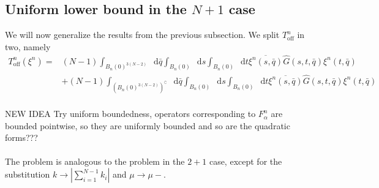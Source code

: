 \documentclass[a4paper,11pt]{article}
\newcommand{\abs}[1]{\left\lvert #1 \right\rvert}
\newcommand*\diff{\mathop{}\!\mathrm{d}}
\numberwithin{equation}{section}
\begin{document}
	\subsection{Uniform lower bound in the $ N+1 $ case}
	We will now generalize the results from the previous subsection. 
	We split $ T^n_{\text{off}} $ in two, namely 
	\begin{equation}
	\begin{aligned}
	T^n_{\text{off}}(\xi^n)=&(N-1)\int_{B_n(0)^{3(N-2)}}\diff \bar{q}\int_{B_n(0)}\diff s\int_{B_n(0)}\diff t \overline{\xi^n(s,\bar{q})}\hat{G}(s,t,\bar{q})\xi^n(t,\bar{q})\\
	&+(N-1)\int_{(B_n(0)^{3(N-2)})^\complement}\diff \bar{q}\int_{B_n(0)}\diff s\int_{B_n(0)}\diff t \overline{\xi^n(s,\bar{q})}\hat{G}(s,t,\bar{q})\xi^n(t,\bar{q})
	\end{aligned}
	\end{equation}
	\\
	NEW IDEA
	Try uniform boundedness, operators corresponding to $ F_\alpha^n $ are bounded pointwise, so they are uniformly bounded and so are the quadratic forms???\\
	\\
	The problem is analogous to the problem in the $ 2+1 $ case, except for the substitution $ k\to\abs{\sum_{i=1}^{N-1}k_i} $ and $ \mu\to\mu- $.
	
\end{document}
